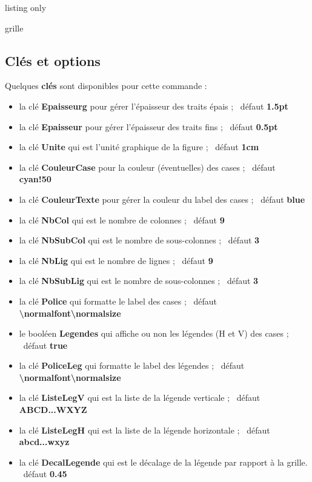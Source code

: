 \documentclass[a4paper,french,11pt]{article}
\newcommand\Cle[1]{{\bfseries\sffamily\textlangle \textcolor{orange!75!black}{#1}\textrangle}}
\begin{document}
\begin{PresCodeTexPL}{listing only}

\begin{EnvSudoMaths}[clés]{grille}
\end{EnvSudoMaths}
\end{PresCodeTexPL}

\pagebreak

\subsection{Clés et options}

\begin{cautionblock}
Quelques \Cle{clés} sont disponibles pour cette commande :

\begin{itemize}
	\item la clé \Cle{Epaisseurg} pour gérer l'épaisseur des traits épais ; \hfill~défaut \Cle{1.5pt}
	\item la clé \Cle{Epaisseur} pour gérer l'épaisseur des traits fins ; \hfill~défaut \Cle{0.5pt}
	\item la clé \Cle{Unite} qui est l'unité graphique de la figure ; \hfill~défaut \Cle{1cm}
	\item la clé \Cle{CouleurCase} pour la couleur (éventuelles) des cases ; \hfill~défaut \Cle{cyan!50}
	\item la clé \Cle{CouleurTexte} pour gérer la couleur du label des cases ; \hfill~défaut \Cle{blue}
	\item la clé \Cle{NbCol} qui est le nombre de colonnes ; \hfill~défaut \Cle{9}
	\item la clé \Cle{NbSubCol} qui est le nombre de sous-colonnes ; \hfill~défaut \Cle{3}
	\item la clé \Cle{NbLig} qui est le nombre de lignes ; \hfill~défaut \Cle{9}
	\item la clé \Cle{NbSubLig} qui est le nombre de sous-colonnes ; \hfill~défaut \Cle{3}
	\item la clé \Cle{Police} qui formatte le label des cases ; \hfill~défaut \Cle{\textbackslash{}normalfont\textbackslash{}normalsize}
	\item le booléen \Cle{Legendes} qui affiche ou non les légendes (H et V) des cases ; \hfill~défaut \Cle{true}
	\item la clé \Cle{PoliceLeg} qui formatte le label des légendes ; \hfill~défaut \Cle{\textbackslash{}normalfont\textbackslash{}normalsize}
	\item la clé \Cle{ListeLegV} qui est la liste de la légende verticale ; \hfill~défaut \Cle{ABCD...WXYZ}
	\item la clé \Cle{ListeLegH} qui est la liste de la légende horizontale ; \hfill~défaut \Cle{abcd...wxyz}
	\item la clé \Cle{DecalLegende} qui est le décalage de la légende par rapport à la grille. \hfill~défaut \Cle{0.45}
\end{itemize}
\vspace*{-\baselineskip}\leavevmode
\end{cautionblock}
\end{document}
